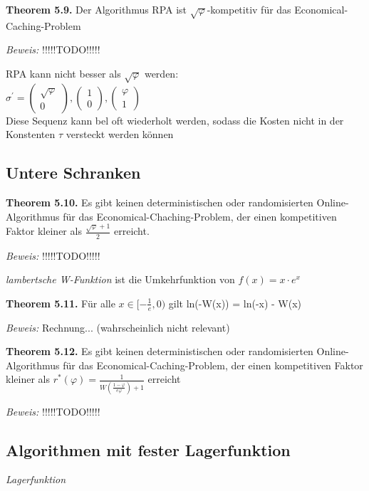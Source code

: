 \textbf{Theorem 5.9.} Der Algorithmus RPA ist $\sqrt{\varphi}$-kompetitiv für das Economical-Caching-Problem

\textit{Beweis:} !!!!!TODO!!!!!

RPA kann nicht besser als $\sqrt{\varphi}$ werden: \\
$\sigma^{'} = \left(\begin{array}{c} \sqrt{\varphi} \\ 0 \end{array}\right), \left(\begin{array}{c} 1 \\ 0 \end{array}\right), \left(\begin{array}{c} \varphi \\ 1 \end{array}\right)$ \\
Diese Sequenz kann bel oft wiederholt werden, sodass die Kosten nicht in der Konstenten $\tau$ versteckt werden können

\subsection{Untere Schranken}

\textbf{Theorem 5.10.} Es gibt keinen deterministischen oder randomisierten Online-Algorithmus für das Economical-Chaching-Problem, der einen kompetitiven Faktor kleiner als $\frac{\sqrt{\varphi} +1}{2}$ erreicht.

\textit{Beweis:} !!!!!TODO!!!!!

\textit{lambertsche W-Funktion} ist die Umkehrfunktion von $f(x) = x \cdot e^{x}$

\textbf{Theorem 5.11.} Für alle $x \in [-\frac{1}{e}, 0)$ gilt ln(-W(x)) = ln(-x) - W(x)

\textit{Beweis:} Rechnung... (wahrscheinlich nicht relevant)

\textbf{Theorem 5.12.} Es gibt keinen deterministischen oder randomisierten Online-Algorithmus für das Economical-Caching-Problem, der einen kompetitiven Faktor kleiner als $r^{*}(\varphi) = \frac{1}{W(\frac{1-\varphi}{e\varphi})+1}$ erreicht

\textit{Beweis:} !!!!!TODO!!!!!

\subsection{Algorithmen mit fester Lagerfunktion}

\textit{Lagerfunktion}

